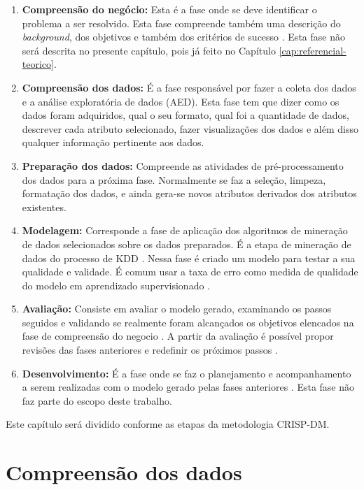 \documentclass[diss,capa]{texufpel}
\begin{document}
\begin{enumerate}
\item \textbf{Compreensão do negócio:} Esta é a fase onde se deve identificar o problema a ser resolvido. Esta fase compreende também uma descrição do \textit{background}, dos objetivos e também dos critérios de sucesso \cite{Melo2007}. Esta fase não será descrita no presente capítulo, pois já feito no Capítulo \ref{cap:referencial-teorico}.
\item \textbf{Compreensão dos dados:} É a fase responsável por fazer a coleta dos dados e a análise exploratória de dados (AED). Esta fase tem que dizer como os dados foram adquiridos, qual o seu formato, qual foi a quantidade de dados, descrever cada atributo selecionado, fazer visualizações dos dados e além disso qualquer informação pertinente aos dados.
\item \textbf{Preparação dos dados:} Compreende as atividades de pré-processamento dos dados para a próxima fase. Normalmente se faz a seleção, limpeza, formatação dos dados, e ainda gera-se novos atributos derivados dos atributos existentes.
\item \textbf{Modelagem:} Corresponde a fase de aplicação dos algoritmos de mineração de dados selecionados sobre os dados preparados. É a etapa de mineração de dados do processo de KDD \cite{goldschmidt2015data}. Nessa fase é criado um modelo para testar a sua qualidade e validade. É comum usar a taxa de erro como medida de qualidade do modelo em aprendizado supervisionado \cite{Melo2007}.
\item \textbf{Avaliação:} Consiste em avaliar o modelo gerado, examinando os passos seguidos e validando se realmente foram alcançados os objetivos elencados na fase de compreensão do negocio \cite{Melo2007}. A partir da avaliação é possível propor revisões das fases anteriores e redefinir os próximos passos \cite{goldschmidt2015data}.
\item \textbf{Desenvolvimento:} É a fase onde se faz o planejamento e acompanhamento a serem realizadas com o modelo gerado pelas fases anteriores \cite{goldschmidt2015data}. Esta fase não faz parte do escopo deste trabalho.
\end{enumerate}

Este capítulo será dividido conforme as etapas da metodologia CRISP-DM.

\section{Compreensão dos dados}
\label{sec:compreensao-dados}
\end{document}
